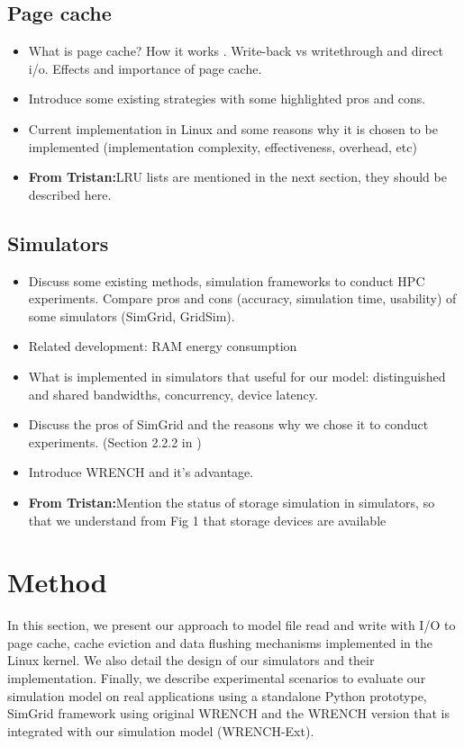 \documentclass[conference]{IEEEtran}
\newcommand{\tristan}[1]{\color{orange}\textbf{From Tristan:}#1\color{black}}
\begin{document}
		\subsection{Page cache}
			\begin{itemize}
				\item What is page cache? How it works \cite{linuxdev3rd2010}. 
				Write-back vs writethrough and direct i/o. Effects and importance of page cache.
				\item Introduce some existing strategies with some highlighted pros and cons.
				\item Current implementation in Linux and some reasons why it is chosen to be implemented (implementation complexity, effectiveness, overhead, etc) \cite{linuxdev3rd2010}
				\item \tristan{LRU lists are mentioned in the next section, they should be described here.}
			\end{itemize}									

		\subsection{Simulators}
			\begin{itemize}
				\item Discuss some existing methods, simulation frameworks to conduct HPC experiments. Compare pros and cons (accuracy, simulation time, usability) of some simulators (SimGrid, GridSim).
				\item Related development: RAM energy consumption \cite{gill2019} \cite{ouarnoughi2017} 
				\item What is implemented in simulators that useful for our model:
				distinguished and shared bandwidths, concurrency, device latency. 
				\item Discuss the pros of SimGrid and the reasons why we chose it to conduct experiments. (Section 2.2.2 in \cite{simgrid2014})
				\item Introduce WRENCH and it's advantage.
				\item \tristan{Mention the status of storage simulation in simulators, so that we understand from Fig 1 that storage devices are available}
			\end{itemize}
			
	\section{Method}

		In this section, we present our approach to model file read and write with
		I/O to page cache, cache eviction and data flushing mechanisms implemented 
		in the Linux kernel. We also detail the design of our simulators and their
		implementation. Finally, we describe experimental scenarios to evaluate
		our simulation model on real applications using a standalone Python
		prototype, SimGrid framework using original WRENCH and the WRENCH version 
		that is integrated with our simulation model (WRENCH-Ext).
\end{document}

